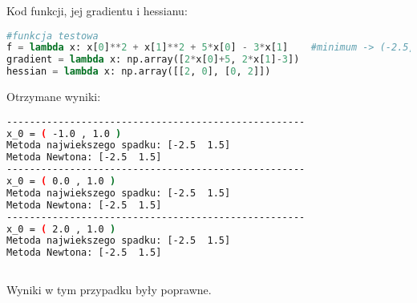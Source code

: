 \documentclass{article}
\begin{document}
	Kod funkcji, jej gradientu i hessianu:

	\begin{lstlisting}[language=Python]
#funkcja testowa
f = lambda x: x[0]**2 + x[1]**2 + 5*x[0] - 3*x[1]    #minimum -> (-2.5, 1.5)
gradient = lambda x: np.array([2*x[0]+5, 2*x[1]-3])
hessian = lambda x: np.array([[2, 0], [0, 2]])
	\end{lstlisting}

	Otrzymane wyniki:

	\begin{lstlisting}[language=bash]
----------------------------------------------------
x_0 = ( -1.0 , 1.0 )
Metoda najwiekszego spadku: [-2.5  1.5]
Metoda Newtona: [-2.5  1.5]
----------------------------------------------------
x_0 = ( 0.0 , 1.0 )
Metoda najwiekszego spadku: [-2.5  1.5]
Metoda Newtona: [-2.5  1.5]
----------------------------------------------------
x_0 = ( 2.0 , 1.0 )
Metoda najwiekszego spadku: [-2.5  1.5]
Metoda Newtona: [-2.5  1.5]
						
	\end{lstlisting}

	Wyniki w tym przypadku były poprawne.





	
	
\end{document}
